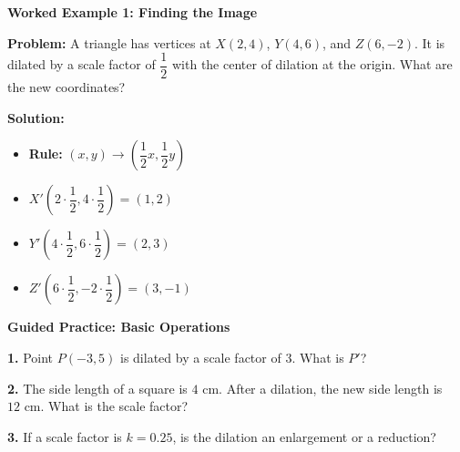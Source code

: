 \documentclass[12pt, letterpaper, fleqn]{article}
\begin{document}
\vspace{3mm}

\begin{tcolorbox}[colback=white, colframe=black!25, boxrule=0.6pt, arc=4mm, left=6mm, right=6mm, top=5mm, bottom=5mm]

\textbf{Worked Example 1: Finding the Image}

\medskip

\textbf{Problem:} A triangle has vertices at $X(2, 4)$, $Y(4, 6)$, and $Z(6, -2)$. It is dilated by a scale factor of $\dfrac{1}{2}$ with the center of dilation at the origin. What are the new coordinates?

\medskip

\textbf{Solution:}
\begin{itemize}
    \item \textbf{Rule:} $(x, y) \rightarrow (\dfrac{1}{2}x, \dfrac{1}{2}y)$
    \item $X'(2 \cdot \dfrac{1}{2}, 4 \cdot \dfrac{1}{2}) = (1, 2)$
    \item $Y'(4 \cdot \dfrac{1}{2}, 6 \cdot \dfrac{1}{2}) = (2, 3)$
    \item $Z'(6 \cdot \dfrac{1}{2}, -2 \cdot \dfrac{1}{2}) = (3, -1)$
\end{itemize}

\end{tcolorbox}

\vspace{4mm}

\begin{tcolorbox}[colback=white!15, colframe=black, boxrule=1.5pt, arc=4mm, left=6mm, right=6mm, top=5mm, bottom=5mm]

\textbf{Guided Practice: Basic Operations}

\medskip

\noindent
\textbf{1.} Point $P(-3, 5)$ is dilated by a scale factor of 3. What is $P'$?
\vspace{1.5cm}

\noindent
\textbf{2.} The side length of a square is $4\text{ cm}$. After a dilation, the new side length is $12\text{ cm}$. What is the scale factor?
\vspace{1.5cm}

\noindent
\textbf{3.} If a scale factor is $k = 0.25$, is the dilation an enlargement or a reduction?
\vspace{1.5cm}

\end{tcolorbox}
\end{document}
